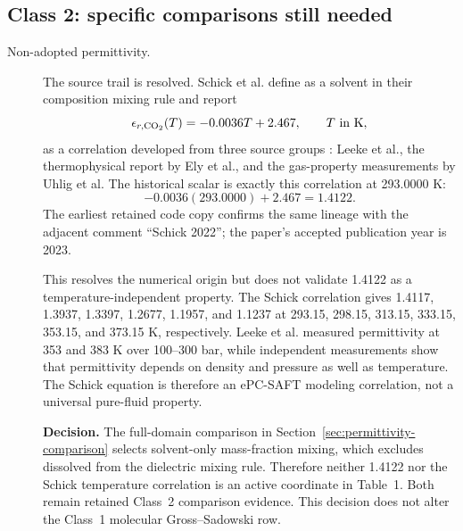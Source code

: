 \documentclass[10pt,oneside]{scrartcl}
\begin{document}
\subsection{Class 2: specific comparisons still needed}

\begin{description}
\item[Non-adopted  permittivity.]\label{sec:co2-permittivity} The source trail is
resolved. Schick et al. define  as a solvent in their composition
mixing rule and report
\begin{equation*}
  \epsilon_{r,\ce{CO2}}(T)=-0.0036T+2.467, \qquad T\text{ in K},
\end{equation*}
as a correlation developed from three source groups
\cite[Table~2, p.~4]{Schick2023}: Leeke et al., the thermophysical report
by Ely et al., and the gas-property measurements by Uhlig et al. The
historical scalar is exactly this
correlation at 293.0000 K:
\begin{equation*}
  -0.0036(293.0000)+2.467=1.4122.
\end{equation*}
The earliest retained code copy confirms the same lineage with the adjacent
comment ``Schick 2022''; the paper's accepted publication year is 2023.

This resolves the numerical origin but does not validate 1.4122 as a
temperature-independent property. The Schick correlation gives 1.4117,
1.3937, 1.3397, 1.2677, 1.1957, and 1.1237 at 293.15, 298.15, 313.15,
333.15, 353.15, and 373.15 K, respectively. Leeke et al. measured 
permittivity at 353 and 383 K over 100--300 bar, while independent measurements
show that  permittivity depends on density and pressure as well as
temperature. The Schick equation is therefore an ePC-SAFT modeling
correlation, not a universal pure-fluid property.

\textbf{Decision.} The full-domain comparison in
Section~\ref{sec:permittivity-comparison} selects solvent-only mass-fraction mixing,
which excludes dissolved  from the dielectric mixing rule. Therefore
neither 1.4122 nor the Schick temperature correlation is an active coordinate
in Table~1. Both remain retained Class~2 comparison evidence. This decision
does not alter the Class~1 molecular Gross--Sadowski row.


\end{description}
\end{document}
